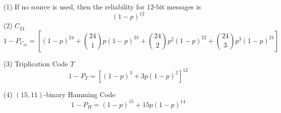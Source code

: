 (1) If no source is used, then the reliability for $ 12 $-bit messages is
\[ (1-p)^{12} \]
(2) $ C_{24} $
\[ 1-P_{C_{24}}=\left[ (1-p)^{24}+\binom{24}{1}p(1-p)^{23}+\binom{24}{2}p^2(1-p)^{22}
        + \binom{24}{3}p^3 (1-p)^{21} \right] \]

(3) Triplication Code $ T $
\[ 1-P_T=\left[ (1-p)^3+3p(1-p)^2 \right]^{12} \]

(4) $ (15,11) $-binary Hamming Code
\[ 1-P_H=(1-p)^{15}+15p(1-p)^{14} \]
